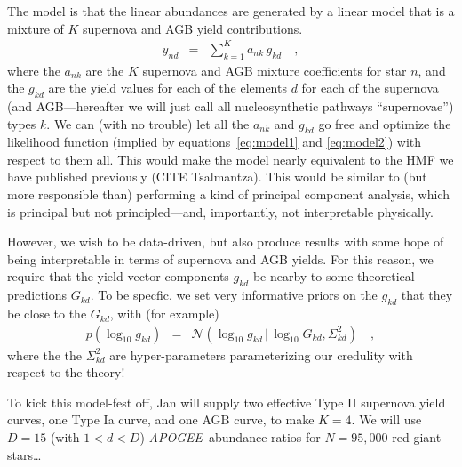 \documentclass[12pt, preprint]{aastex}
\newcommand{\equationname}{equation}
\newcommand{\acronym}[1]{{\small{#1}}}
\newcommand{\project}[1]{\textsl{#1}}
\newcommand{\apogee}{\project{\acronym{APOGEE}}}
\newcommand{\given}{\,|\,}
\newcommand{\normal}{\mathcal{N}}
\begin{document}
The model is that the linear abundances are generated by a linear model
that is a mixture of $K$ supernova and AGB yield contributions.
\begin{eqnarray}
  y_{nd} &=& \sum_{k=1}^K a_{nk}\,g_{kd}
\quad ,
\end{eqnarray}
where the $a_{nk}$ are the $K$ supernova and AGB mixture coefficients
for star $n$, and the $g_{kd}$ are the yield values for each of the
elements $d$ for each of the supernova (and AGB---hereafter we will
just call all nucleosynthetic pathways ``supernovae'') types $k$.
We can (with no trouble) let all the $a_{nk}$ and $g_{kd}$ go free and
optimize the likelihood function (implied by
\equationname s~\ref{eq:model1} and \ref{eq:model2}) with respect to them all.
This would make the model nearly equivalent to the HMF we have published
previously (CITE Tsalmantza).
This would be similar to (but more responsible than) performing a kind
of principal component analysis, which is principal but not
principled---and, importantly, not interpretable physically.

However, we wish to be data-driven, but also produce results with some
hope of being interpretable in terms of supernova and AGB yields.
For this reason, we require that the yield vector components $g_{kd}$
be nearby to some theoretical predictions $G_{kd}$.
To be specfic, we set very informative priors on the $g_{kd}$ that they
be close to the $G_{kd}$, with (for example)
\begin{eqnarray}
  p(\log_{10} g_{kd}) &=& \normal(\log_{10} g_{kd}\given \log_{10} G_{kd},\Sigma^2_{kd})
\quad ,
\end{eqnarray}
where the the $\Sigma^2_{kd}$ are hyper-parameters parameterizing our credulity
with respect to the theory!

To kick this model-fest off, Jan will supply two effective Type II
supernova yield curves, one Type Ia curve, and one AGB curve, to make
$K=4$.  We will use $D=15$ (with $1<d<D$) \apogee\ abundance ratios
for $N=95,000$ red-giant stars\ldots
\end{document}
